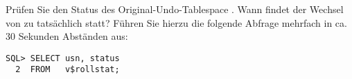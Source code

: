         \item Prüfen Sie den Status des Original-Undo-Tablespace
        . Wann findet der Wechsel von 
        zu  tatsächlich statt? Führen Sie hierzu die
        folgende Abfrage mehrfach in ca. 30 Sekunden Abständen aus:

        \begin{lstlisting}[language=oracle_sql]
SQL> SELECT usn, status
  2  FROM   v$rollstat;
        \end{lstlisting}
